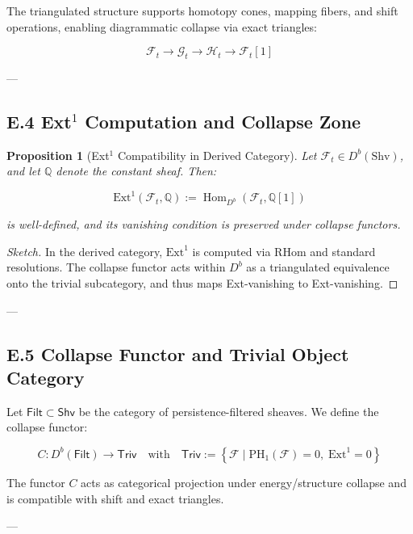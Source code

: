 \documentclass[11pt]{article}
\newtheorem{proposition}[theorem]{Proposition}
\begin{document}
The triangulated structure supports homotopy cones, mapping fibers, and shift operations,  
enabling diagrammatic collapse via exact triangles:

\[
\mathcal{F}_t \to \mathcal{G}_t \to \mathcal{H}_t \to \mathcal{F}_t[1]
\]

---

\subsection*{E.4 Ext$^1$ Computation and Collapse Zone}

\begin{proposition}[Ext$^1$ Compatibility in Derived Category]
Let \( \mathcal{F}_t \in D^b(\mathrm{Shv}) \), and let \( \mathbb{Q} \) denote the constant sheaf.  
Then:

\[
\mathrm{Ext}^1(\mathcal{F}_t, \mathbb{Q}) := \operatorname{Hom}_{D^b}(\mathcal{F}_t, \mathbb{Q}[1])
\]

is well-defined, and its vanishing condition is preserved under collapse functors.
\end{proposition}

\begin{proof}[Sketch]
In the derived category, \( \mathrm{Ext}^1 \) is computed via RHom and standard resolutions.  
The collapse functor acts within \( D^b \) as a triangulated equivalence onto the trivial subcategory,  
and thus maps Ext-vanishing to Ext-vanishing.
\end{proof}

---

\subsection*{E.5 Collapse Functor and Trivial Object Category}

Let \( \mathsf{Filt} \subset \mathsf{Shv} \) be the category of persistence-filtered sheaves.  
We define the collapse functor:

\[
C : D^b(\mathsf{Filt}) \to \mathsf{Triv}
\quad \text{with} \quad \mathsf{Triv} := \left\{ \mathcal{F} \mid \mathrm{PH}_1(\mathcal{F}) = 0,\; \mathrm{Ext}^1 = 0 \right\}
\]

The functor \( C \) acts as categorical projection under energy/structure collapse  
and is compatible with shift and exact triangles.

---
\end{document}
